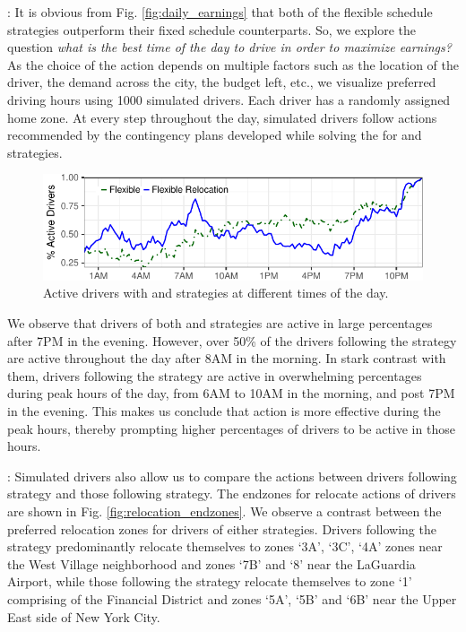 : It is obvious from Fig. \ref{fig:daily_earnings} that both of the flexible schedule strategies outperform their fixed schedule counterparts. So, we explore the question \textit{what is the best time of the day to drive in order to maximize earnings?} As the choice of the {\gohome} action depends on multiple factors such as the location of the driver, the demand across the city, the budget left, etc., we visualize preferred driving hours using 1000 simulated drivers. Each driver has a randomly assigned home zone. At every step throughout the day, simulated drivers follow actions recommended by the contingency plans developed while solving the {\originalproblem} for {\flexible} and {\relocationflexible} strategies.

\begin{figure}[H]
	\centering
	\includegraphics[scale=0.75]{figures/simulated_schedules.pdf}
	\caption{Active drivers with {\flexible} and {\relocationflexible}
	strategies at different times of the day.}
	\label{fig:simulated_schedules}
\end{figure}

We observe that drivers of both {\flexible} and {\relocationflexible} strategies are active in large percentages after 7PM in the evening. However, over 50\% of the drivers following the {\flexible} strategy are active throughout the day after 8AM in the morning. In stark contrast with them, drivers following the {\relocationflexible} strategy are active in overwhelming percentages during peak hours of the day, from 6AM to 10AM in the morning, and post 7PM in the evening. This makes us conclude that {\relocate} action is more effective during the peak hours, thereby prompting higher percentages of {\relocationflexible} drivers to be active in those hours.

:
Simulated drivers also allow us to compare the {\relocate} actions between drivers following {\relocation} strategy and those following {\relocationflexible} strategy. The endzones for relocate actions of drivers are shown in Fig. \ref{fig:relocation_endzones}. We observe a contrast between the preferred relocation zones for drivers of either strategies. Drivers following the {\relocation} strategy predominantly relocate themselves to zones `3A', `3C', `4A' zones near the West Village neighborhood and zones `7B' and `8' near the LaGuardia Airport, while those following the {\relocationflexible} strategy relocate themselves to zone `1' comprising of the Financial District and zones `5A', `5B' and `6B' near the Upper East side of New York City.

